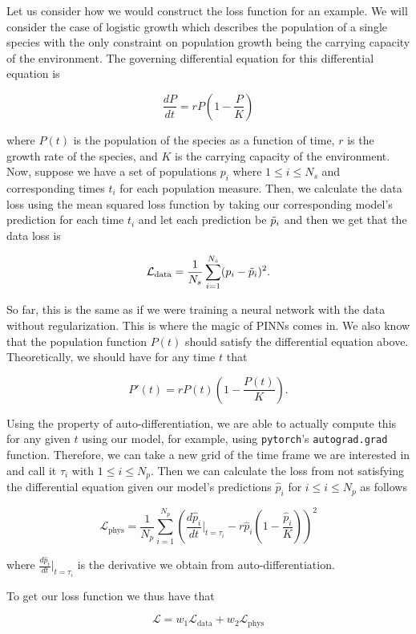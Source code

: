 \documentclass{article}
\begin{document}
Let us consider how we would construct the loss function for an example. We will consider the case of logistic growth which describes the population of a single species with the only constraint on population growth being the carrying capacity of the environment. The governing differential equation for this differential equation is

$$\frac{dP}{dt} = r P \left(1 - \frac{P}{K} \right)$$

where $P(t)$ is the population of the species as a function of time, $r$ is the growth rate of the species, and $K$ is the carrying capacity of the environment. Now, suppose we have a set of populations $p_i$ where $1 \leq i \leq N_s$ and corresponding times $t_i$ for each population measure. Then, we calculate the data loss using the mean squared loss function by taking our corresponding model's prediction for each time $t_i$ and let each prediction be $\Tilde{p}_i$ and then we get that the data loss is

$$\mathcal{L}_{\text{data}} = \frac{1}{N_s} \sum_{i = 1}^{N_s} (p_i - \Tilde{p}_i)^2.$$

So far, this is the same as if we were training a neural network with the data without regularization. This is where the magic of PINNs comes in. We also know that the population function $P(t)$ should satisfy the differential equation above. Theoretically, we should have for any time $t$ that

$$P'(t) = r P(t) \left( 1 - \frac{P(t)}{K} \right).$$

Using the property of auto-differentiation, we are able to actually compute this for any given $t$ using our model, for example, using \texttt{pytorch}'s \texttt{autograd.grad} function. Therefore, we can take a new grid of the time frame we are interested in and call it $\tau_i$ with $1 \leq i \leq N_p$. Then we can calculate the loss from not satisfying the differential equation given our model's predictions $\hat{p}_i$ for $i \leq i \leq N_p$ as follows

$$\mathcal{L}_{\text{phys}} = \frac{1}{N_p} \sum_{i = 1}^{N_p} \left( \frac{d\hat{p}_i}{dt} \big\lvert_{t = \tau_i} -  r \hat{p}_i \left( 1 - \frac{\hat{p}_i}{K}\right)\right)^2$$

where $ \frac{d\hat{p}_i}{dt} \big\lvert_{t = \tau_i}$ is the derivative we obtain from auto-differentiation. 

To get our loss function we thus have that

$$\mathcal{L} = w_1 \mathcal{L}_{\text{data}} + w_2 \mathcal{L}_{\text{phys}}$$
\end{document}
